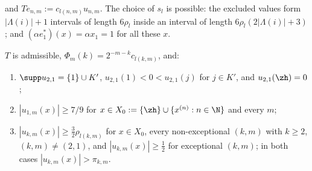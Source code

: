 and $Te_{n,m}:=c_{l(n,m)}u_{n,m}$.  The choice of $s_l$ is possible: the
excluded values form $|\Lambda(i)|+1$ intervals of length $6\rho_l$ inside an
interval of length $6\rho_l(2|\Lambda(i)|+3)$; and $(\alpha
e_1^*)(x)=\alpha x_1=1$ for all these $x$.

\begin{lemma}\label{lem:T}
$T$ is admissible, $\Phi_m(k)=2^{-m-k}c_{l(k,m)}$, and:
\begin{enumerate}
\item[(P1)] $\supp u_{2,1}=\{1\}\cup K'$, $u_{2,1}(1)<0<u_{2,1}(j)$ for
$j\in K'$, and $u_{2,1}(\zh)=0$;
\item[(P2)] $|u_{1,m}(x)|\ge7/9$ for $x\in X_0:=\{\zh\}\cup\{x^{(n)}:n\in\N\}$
and every $m$;
\item[(P3)] $|u_{k,m}(x)|\ge\frac32\rho_{l(k,m)}$ for $x\in X_0$, every
non-exceptional $(k,m)$ with $k\ge2$, $(k,m)\ne(2,1)$, and
$|u_{k,m}(x)|\ge\frac12$ for exceptional $(k,m)$; in both cases
$|u_{k,m}(x)|>\pi_{k,m}$.
\end{enumerate}
\end{lemma}

